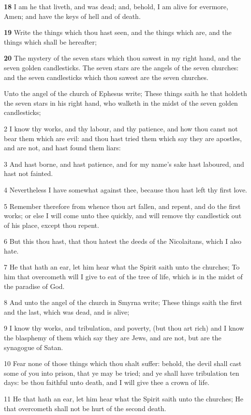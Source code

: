 \documentclass[11pt,a4paper,twocolumn,twoside]{book}
\newcommand{\vn}[1]{{\scriptsize\textbf{#1}}}
\begin{document}
\vn{18} I am he that liveth, and was dead; and, behold, I am alive for evermore, Amen; and have the keys of hell and of death.

\vn{19} Write the things which thou hast seen, and the things which are, and the things which shall be hereafter;

\vn{20} The mystery of the seven stars which thou sawest in my right hand, and the seven golden candlesticks. The seven stars are the angels of the seven churches: and the seven candlesticks which thou sawest are the seven churches.

Unto the angel of the church of Ephesus write; These things saith he that holdeth the seven stars in his right hand, who walketh in the midst of the seven golden candlesticks;

2 I know thy works, and thy labour, and thy patience, and how thou canst not bear them which are evil: and thou hast tried them which say they are apostles, and are not, and hast found them liars:

3 And hast borne, and hast patience, and for my name's sake hast laboured, and hast not fainted.

4 Nevertheless I have somewhat against thee, because thou hast left thy first love.

5 Remember therefore from whence thou art fallen, and repent, and do the first works; or else I will come unto thee quickly, and will remove thy candlestick out of his place, except thou repent.

6 But this thou hast, that thou hatest the deeds of the Nicolaitans, which I also hate.

7 He that hath an ear, let him hear what the Spirit saith unto the churches; To him that overcometh will I give to eat of the tree of life, which is in the midst of the paradise of God.

8 And unto the angel of the church in Smyrna write; These things saith the first and the last, which was dead, and is alive;

9 I know thy works, and tribulation, and poverty, (but thou art rich) and I know the blasphemy of them which say they are Jews, and are not, but are the synagogue of Satan.

10 Fear none of those things which thou shalt suffer: behold, the devil shall cast some of you into prison, that ye may be tried; and ye shall have tribulation ten days: be thou faithful unto death, and I will give thee a crown of life.

11 He that hath an ear, let him hear what the Spirit saith unto the churches; He that overcometh shall not be hurt of the second death.
\end{document}
